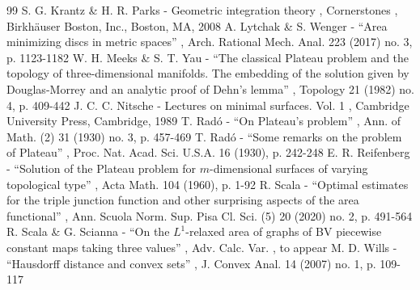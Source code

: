 \documentclass[11pt]{article}
\numberwithin{equation}{section}
\theoremstyle{definition}
\begin{document}
\begin{thebibliography}{99}
 S. G. Krantz \& H. R. Parks - Geometric integration theory , Cornerstones , Birkhäuser Boston, Inc., Boston, MA, 2008
 A. Lytchak \& S. Wenger - “Area minimizing discs in metric spaces” , Arch. Rational Mech. Anal. 223 (2017) no. 3, p. 1123-1182
 W. H. Meeks \& S. T. Yau - “The classical Plateau problem and the topology of three-dimensional manifolds. The embedding of the solution given by Douglas-Morrey and an analytic proof of Dehn’s lemma” , Topology 21 (1982) no. 4, p. 409-442
 J. C. C. Nitsche - Lectures on minimal surfaces. Vol. 1 , Cambridge University Press, Cambridge, 1989
 T. Radó - “On Plateau’s problem” , Ann. of Math. (2) 31 (1930) no. 3, p. 457-469
 T. Radó - “Some remarks on the problem of Plateau” , Proc. Nat. Acad. Sci. U.S.A. 16 (1930), p. 242-248
 E. R. Reifenberg - “Solution of the Plateau problem for $m$-dimensional surfaces of varying topological type” , Acta Math. 104 (1960), p. 1-92
 R. Scala - “Optimal estimates for the triple junction function and other surprising aspects of the area functional” , Ann. Scuola Norm. Sup. Pisa Cl. Sci. (5) 20 (2020) no. 2, p. 491-564
 R. Scala \& G. Scianna - “On the $L^1$-relaxed area of graphs of BV piecewise constant maps taking three values” , Adv. Calc. Var. , to appear
 M. D. Wills - “Hausdorff distance and convex sets” , J. Convex Anal. 14 (2007) no. 1, p. 109-117
\end{thebibliography}
\end{document}
